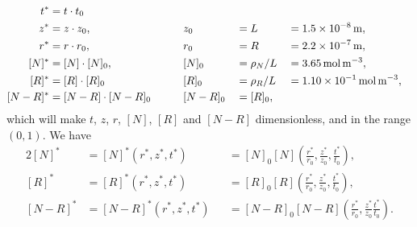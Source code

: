 \documentclass{article}
\begin{document}
\begin{alignat}{4}
    t^* &= t \cdot t_0 \\
    z^* &= z \cdot z_0, \quad\quad & &z_0 & &= L &&= \SI{1.5d-8}{\meter}, \\
    r^* &= r \cdot r_0, \quad\quad & &r_0 & &= R  &&= \SI{2.2d-7}{\meter},\\
    [N]^* &= [N]\cdot [N]_0, \quad\quad & &[N]_0 & &= \rho_N / L  &&= \SI{3.65}{\mol\per\cubic\meter},\\
    [R]^* &= [R]\cdot [R]_0  \quad\quad & &[R]_0 & &= \rho_R / L &&= \SI{1.10d-1}{\mol\per\cubic\meter},\\
    [N-R]^* &= [N-R]\cdot [N-R]_0 \quad\quad & & [N-R]_0 & &= [R]_0,
    \label{eq:ic}
\end{alignat}
which will make $t$, $z$, $r$, $[N]$, $[R]$ and $[N-R]$ dimensionless, and in the range $(0,1)$.
We have
\begin{alignat*}{2}
 [N]^* &= [N]^*(r^*, z^*, t^*) &&= [N]_0 [N]\left(\frac{r^*}{r_0}, \frac{z^*}{z_0}, \frac{t^*}{t_0}\right), \\
 [R]^* &= [R]^*(r^*, z^*, t^*) &&= [R]_0 [R]\left(\frac{r^*}{r_0}, \frac{z^*}{z_0}, \frac{t^*}{t_0}\right), \\
 [N-R]^* &= [N-R]^*(r^*, z^*, t^*) &&= [N-R]_0[N-R]\left(\frac{r^*}{r_0}, \frac{z^*}{z_0} \frac{t^*}{t_0}\right). \\
\end{alignat*}
\end{document}
